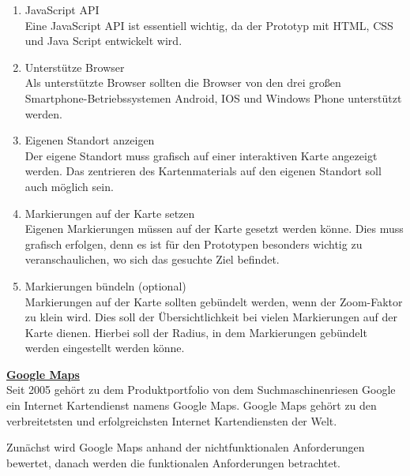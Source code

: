 \begin{enumerate}
\item JavaScript API\\
Eine JavaScript API ist essentiell wichtig, da der Prototyp mit HTML, CSS und Java Script entwickelt wird. 

\item Unterstütze Browser\\
Als unterstützte Browser sollten die Browser von den drei großen Smartphone-Betriebssystemen Android, IOS und Windows Phone unterstützt werden.  

\item Eigenen Standort anzeigen\\
Der eigene Standort muss grafisch auf einer interaktiven Karte angezeigt werden. Das zentrieren des Kartenmaterials auf den eigenen Standort soll auch möglich sein.

\item Markierungen auf der Karte setzen\\
Eigenen Markierungen müssen auf der Karte gesetzt werden könne. Dies muss grafisch erfolgen, denn es ist für den Prototypen besonders wichtig zu veranschaulichen, wo sich das gesuchte Ziel befindet. 

\item Markierungen bündeln (optional)\\
Markierungen auf der Karte sollten gebündelt werden, wenn der Zoom-Faktor zu klein wird. Dies soll der Übersichtlichkeit bei vielen Markierungen auf der Karte dienen. Hierbei soll der Radius, in dem Markierungen gebündelt werden eingestellt werden könne.

\end{enumerate}



\textbf{\underline{Google Maps}}\\
Seit 2005 gehört zu dem Produktportfolio von dem Suchmaschinenriesen Google ein Internet Kartendienst namens Google Maps. 
Google Maps gehört zu den verbreitetsten und erfolgreichsten Internet Kartendiensten der Welt. \cite[Lexikon Google Maps]{itwissen}\cite[S.88]{gruber2015}

Zunächst wird Google Maps anhand der nichtfunktionalen Anforderungen bewertet, danach werden die funktionalen Anforderungen betrachtet.

